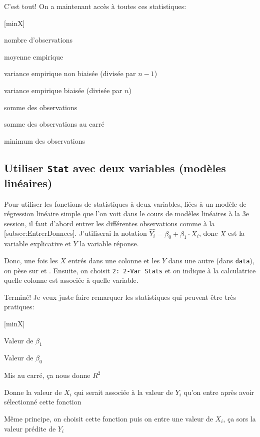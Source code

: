 C'est tout! On a maintenant accès à toutes ces statistiques:

\begin{desclist}{\sf}{ \rm\hfill}[minX]

\item [n] nombre d'observations
\item [x] moyenne empirique
\item [Sx] variance empirique non biaisée (divisée par ${n - 1}$)
\item [$\sigma_{x}$] variance empirique biaisée (divisée par ${n}$)
\item [$\sum x$] somme des observations
\item [$\sum x^{2}$] somme des observations au carré
\item [minX] minimum des observations
\item [\ldots]

\end{desclist}



\subsection[Utiliser \texttt{Stat} avec deux variables]{Utiliser \texttt{Stat} avec deux variables (modèles linéaires)}
\label{subsec:statdeuxvariables}

Pour utiliser les fonctions de statistiques à deux variables, liées à un modèle de régression linéaire simple que l'on voit dans le cours de modèles linéaires à la 3e session, il faut d'abord entrer les différentes observations comme à la \ref{subsec:EntrerDonnees}. J'utiliserai la notation $\hat{Y_i} = \beta_0 + \beta_1 \cdot X_i$, donc $X$ est la variable explicative et $Y$ la variable réponse.

Donc, une fois les $X$ entrés dans une colonne et les $Y$ dans une autre (dans \texttt{data}), on pèse sur  et . Ensuite, on choisit \texttt{2: 2-Var Stats} et on indique à la calculatrice quelle colonne est associée à quelle variable.

Terminé! Je veux juste faire remarquer les statistiques qui peuvent être très pratiques:

\begin{desclist}{\sf}{ \rm\hfill}[minX]

\item [a] Valeur de $\beta_1$
\item [b] Valeur de $\beta_0$
\item [r] Mis au carré, ça nous donne $R^2$
\item [x'] Donne la valeur de $X_i$ qui serait associée à la valeur de $Y_i$ qu'on entre après avoir sélectionné cette fonction
\item [y'] Même principe, on choisit cette fonction puis on entre une valeur de $X_i$, ça sors la valeur prédite de $Y_i$

\end{desclist}